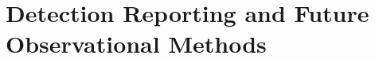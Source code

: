 \documentclass[a4paper,fleqn,usenatbib]{mnras}
\begin{document}
\section{Detection Reporting and Future Observational Methods}

%
%
%
%
\end{document}
